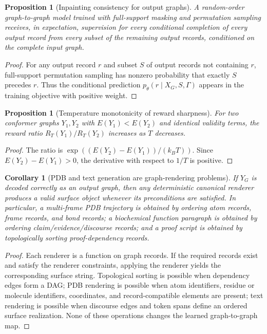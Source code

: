 \documentclass[11pt]{article}
\newtheorem{corollary}[definition]{Corollary}
\newtheorem{proposition}[definition]{Proposition}
\newcommand{\1}{\mathbf{1}}
\begin{document}
\begin{proposition}[Inpainting consistency for output graphs]
A random-order graph-to-graph model trained with full-support masking and permutation sampling receives, in expectation, supervision for every conditional completion of every output record from every subset of the remaining output records, conditioned on the complete input graph.
\end{proposition}
\begin{proof}
For any output record \(r\) and subset \(S\) of output records not containing \(r\), full-support permutation sampling has nonzero probability that exactly \(S\) precedes \(r\). Thus the conditional prediction \(p_\theta(r\mid X_G,S,\Gamma)\) appears in the training objective with positive weight.
\end{proof}

\begin{proposition}[Temperature monotonicity of reward sharpness]
For two conformer graphs \(Y_1,Y_2\) with \(E(Y_1)<E(Y_2)\) and identical validity terms, the reward ratio \(R_T(Y_1)/R_T(Y_2)\) increases as \(T\) decreases.
\end{proposition}
\begin{proof}
The ratio is \(\exp((E(Y_2)-E(Y_1))/(k_BT))\). Since \(E(Y_2)-E(Y_1)>0\), the derivative with respect to \(1/T\) is positive.
\end{proof}

\begin{corollary}[PDB and text generation are graph-rendering problems]
If \(Y_G\) is decoded correctly as an output graph, then any deterministic canonical renderer produces a valid surface object whenever its preconditions are satisfied. In particular, a multi-frame PDB trajectory is obtained by ordering atom records, frame records, and bond records; a biochemical function paragraph is obtained by ordering claim/evidence/discourse records; and a proof script is obtained by topologically sorting proof-dependency records.
\end{corollary}
\begin{proof}
Each renderer is a function on graph records. If the required records exist and satisfy the renderer constraints, applying the renderer yields the corresponding surface string. Topological sorting is possible when dependency edges form a DAG; PDB rendering is possible when atom identifiers, residue or molecule identifiers, coordinates, and record-compatible elements are present; text rendering is possible when discourse edges and token spans define an ordered surface realization. None of these operations changes the learned graph-to-graph map.
\end{proof}
\end{document}
